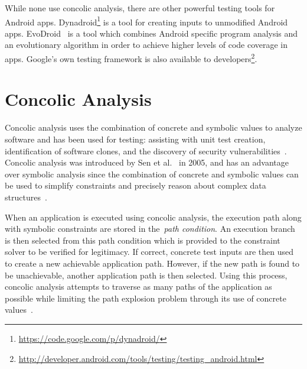 \documentclass{sig-alternate-05-2015}
\newcommand{\dan}[1]{\textcolor{blue}{{\it [Dan says: #1]}}}
\begin{document}
While none use concolic analysis, there are other powerful testing tools for Android apps. Dynadroid\footnote{\url{https://code.google.com/p/dynadroid/}} is a tool for creating inputs to unmodified Android apps. EvoDroid~\cite{Mahmood:2014:ESE:2635868.2635896} is a tool which combines Android specific program analysis and an evolutionary algorithm in order to achieve higher levels of code coverage in apps. Google's own testing framework is also available to developers\footnote{\url{http://developer.android.com/tools/testing/testing_android.html}}.






\section{Concolic Analysis}
\label{sec: concolicanalysis}



Concolic analysis uses the combination of concrete and symbolic values to analyze software and has been used for testing: assisting with unit test creation, identification of software clones, and the discovery of security vulnerabilities~\cite{Sen:2005:CCU:1081706.1081750, Godefroid_automatedwhitebox, 6671332, Krutz_Sac15}. Concolic analysis was introduced by Sen et al.~\cite{Sen:2005:CCU:1081706.1081750} in 2005, and has an advantage over symbolic analysis since the combination of concrete and symbolic values can be used to simplify constraints and precisely reason about complex data structures~\cite{4222603}.

When an application is executed using concolic analysis, the execution path along with symbolic constraints are stored in the~\emph{path condition}. An execution branch is then selected from this path condition which is provided to the constraint solver to be verified for legitimacy. If correct, concrete test inputs are then used to create a new achievable application path. However, if the new path is found to be unachievable, another application path is then selected. Using this process, concolic analysis attempts to traverse as many paths of the application as possible while limiting the path explosion problem through its use of concrete values~\cite{Jaffar:2013:BCT:2491411.2491425}.
\end{document}
